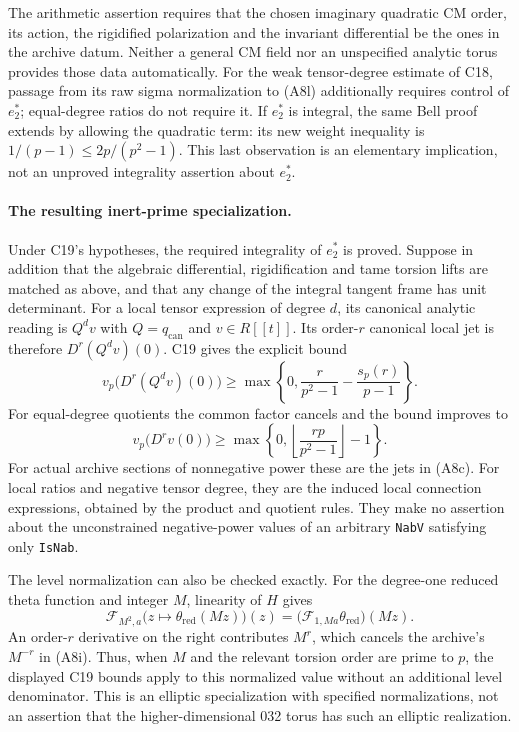 \documentclass[11pt]{article}
\theoremstyle{definition}\newtheorem{definition}[theorem]{Definition}\newtheorem{remark}[theorem]{Remark}
\begin{document}
The arithmetic assertion requires that the chosen imaginary
quadratic CM order, its action, the rigidified polarization and
the invariant differential be the ones in the archive datum.
Neither a general CM field nor an unspecified analytic torus
provides those data automatically.  For the weak tensor-degree
estimate of C18, passage from its raw sigma normalization to
(A8l) additionally requires control of $e_2^*$; equal-degree
ratios do not require it.  If $e_2^*$ is integral, the same Bell
proof extends by allowing the quadratic term: its new weight
inequality is $1/(p-1)\leq2p/(p^2-1)$.  This last observation is
an elementary implication, not an unproved integrality assertion
about $e_2^*$.

\paragraph{The resulting inert-prime specialization.}
Under C19's hypotheses, the required integrality of $e_2^*$ is
proved.  Suppose in addition that the algebraic differential,
rigidification and tame torsion lifts are matched as above, and
that any change of the integral tangent frame has unit determinant.
For a local tensor expression of degree $d$, its canonical
analytic reading is $Q^dv$ with $Q=q_{\mathrm{can}}$ and
$v\in R[[t]]$.  Its order-$r$ canonical local jet is therefore
$D^r(Q^dv)(0)$.  C19 gives the explicit bound
\[
 v_p\bigl(D^r(Q^dv)(0)\bigr)
 \geq\max\left\{0,\frac{r}{p^2-1}
                         -\frac{s_p(r)}{p-1}\right\}.
\]
For equal-degree quotients the common factor cancels and the
bound improves to
\[
 v_p\bigl(D^rv(0)\bigr)
 \geq\max\left\{0,
          \left\lfloor\frac{rp}{p^2-1}\right\rfloor-1\right\}.
\]
For actual archive sections of nonnegative power these are the
jets in (A8c).  For local ratios and negative tensor degree, they
are the induced local connection expressions, obtained by the
product and quotient rules.  They make no assertion about the
unconstrained negative-power values of an arbitrary
\texttt{NabV} satisfying only \texttt{IsNab}.

The level normalization can also be checked exactly.  For the
degree-one reduced theta function and integer $M$, linearity of
$H$ gives
\[
 \mathcal F_{M^2,a}\bigl(z\mapsto\theta_{\mathrm{red}}(Mz)\bigr)(z)
      =\bigl(\mathcal F_{1,Ma}\theta_{\mathrm{red}}\bigr)(Mz).
\]
An order-$r$ derivative on the right contributes $M^r$, which
cancels the archive's $M^{-r}$ in (A8i).  Thus, when $M$ and the
relevant torsion order are prime to $p$, the displayed C19 bounds
apply to this normalized value without an additional level
denominator.  This is an elliptic specialization with specified
normalizations, not an assertion that the higher-dimensional
032 torus has such an elliptic realization.
\end{document}
